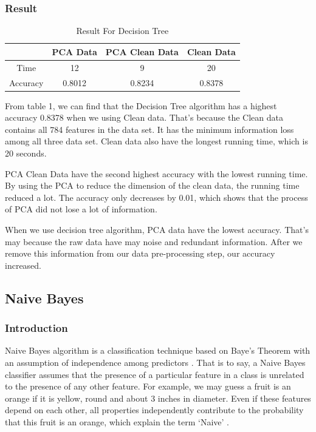 \documentclass[sigconf]{acmart}
\begin{document}
\subsubsection{Result}

\begin{table}[htb]
    \centering
    \begin{tabular}{|c|c|c|c|} \hline
                 &  PCA Data & PCA Clean Data & Clean Data \\ \hline
        Time     &  12       & 9              & 20         \\
        Accuracy &  0.8012   & 0.8234         & 0.8378     \\ \hline
    \end{tabular}
    \caption{Result For Decision Tree}
\end{table}

From table 1, we can find that the Decision Tree algorithm has a highest accuracy 0.8378 when we using Clean data. That's because the Clean data contains all 784 features in the data set. It has the minimum information loss among all three data set. Clean data also have the longest running time, which is 20 seconds. 

PCA Clean Data have the second highest accuracy with the lowest running time. By using the PCA to reduce the dimension of the clean data, the running time reduced a lot. The accuracy only decreases by 0.01, which shows that the process of PCA did not lose a lot of information. 

When we use decision tree algorithm, PCA data have the lowest accuracy. That's may because the raw data have may noise and redundant information. After we remove this information from our data pre-processing step, our accuracy increased.

\subsection{Naive Bayes}

\subsubsection{Introduction}

Naive Bayes algorithm is a classification technique based on Baye's Theorem with an assumption of independence among predictors \cite{nb.steps}. That is to say, a Naive Bayes classifier assumes that the presence of a particular feature in a class is unrelated to the presence of any other feature. For example, we may guess a fruit is an orange if it is yellow, round and about 3 inches in diameter. Even if these features depend on each other, all properties independently contribute to the probability that this fruit is an orange, which explain the term `Naive' \cite{nb.steps}.
\end{document}

